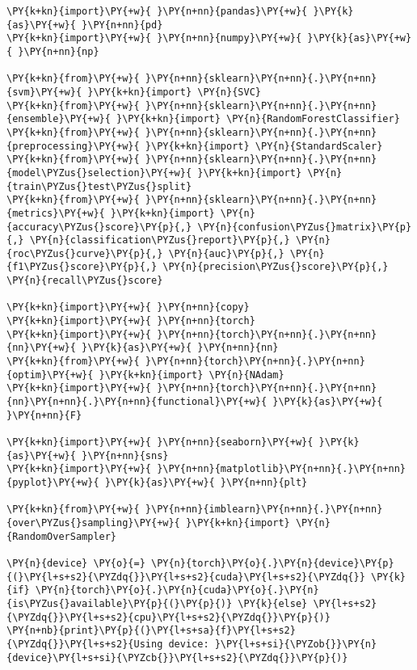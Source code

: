 
    \setcounter{page}{1}
    \begin{tcolorbox}[breakable, size=fbox, boxrule=1pt, pad at break*=1mm,colback=cellbackground, colframe=cellborder]
\begin{Verbatim}[commandchars=\\\{\}]
\PY{k+kn}{import}\PY{+w}{ }\PY{n+nn}{pandas}\PY{+w}{ }\PY{k}{as}\PY{+w}{ }\PY{n+nn}{pd}
\PY{k+kn}{import}\PY{+w}{ }\PY{n+nn}{numpy}\PY{+w}{ }\PY{k}{as}\PY{+w}{ }\PY{n+nn}{np}

\PY{k+kn}{from}\PY{+w}{ }\PY{n+nn}{sklearn}\PY{n+nn}{.}\PY{n+nn}{svm}\PY{+w}{ }\PY{k+kn}{import} \PY{n}{SVC}
\PY{k+kn}{from}\PY{+w}{ }\PY{n+nn}{sklearn}\PY{n+nn}{.}\PY{n+nn}{ensemble}\PY{+w}{ }\PY{k+kn}{import} \PY{n}{RandomForestClassifier}
\PY{k+kn}{from}\PY{+w}{ }\PY{n+nn}{sklearn}\PY{n+nn}{.}\PY{n+nn}{preprocessing}\PY{+w}{ }\PY{k+kn}{import} \PY{n}{StandardScaler}
\PY{k+kn}{from}\PY{+w}{ }\PY{n+nn}{sklearn}\PY{n+nn}{.}\PY{n+nn}{model\PYZus{}selection}\PY{+w}{ }\PY{k+kn}{import} \PY{n}{train\PYZus{}test\PYZus{}split}
\PY{k+kn}{from}\PY{+w}{ }\PY{n+nn}{sklearn}\PY{n+nn}{.}\PY{n+nn}{metrics}\PY{+w}{ }\PY{k+kn}{import} \PY{n}{accuracy\PYZus{}score}\PY{p}{,} \PY{n}{confusion\PYZus{}matrix}\PY{p}{,} \PY{n}{classification\PYZus{}report}\PY{p}{,} \PY{n}{roc\PYZus{}curve}\PY{p}{,} \PY{n}{auc}\PY{p}{,} \PY{n}{f1\PYZus{}score}\PY{p}{,} \PY{n}{precision\PYZus{}score}\PY{p}{,} \PY{n}{recall\PYZus{}score}

\PY{k+kn}{import}\PY{+w}{ }\PY{n+nn}{copy}
\PY{k+kn}{import}\PY{+w}{ }\PY{n+nn}{torch}
\PY{k+kn}{import}\PY{+w}{ }\PY{n+nn}{torch}\PY{n+nn}{.}\PY{n+nn}{nn}\PY{+w}{ }\PY{k}{as}\PY{+w}{ }\PY{n+nn}{nn}
\PY{k+kn}{from}\PY{+w}{ }\PY{n+nn}{torch}\PY{n+nn}{.}\PY{n+nn}{optim}\PY{+w}{ }\PY{k+kn}{import} \PY{n}{NAdam}
\PY{k+kn}{import}\PY{+w}{ }\PY{n+nn}{torch}\PY{n+nn}{.}\PY{n+nn}{nn}\PY{n+nn}{.}\PY{n+nn}{functional}\PY{+w}{ }\PY{k}{as}\PY{+w}{ }\PY{n+nn}{F}

\PY{k+kn}{import}\PY{+w}{ }\PY{n+nn}{seaborn}\PY{+w}{ }\PY{k}{as}\PY{+w}{ }\PY{n+nn}{sns}
\PY{k+kn}{import}\PY{+w}{ }\PY{n+nn}{matplotlib}\PY{n+nn}{.}\PY{n+nn}{pyplot}\PY{+w}{ }\PY{k}{as}\PY{+w}{ }\PY{n+nn}{plt}

\PY{k+kn}{from}\PY{+w}{ }\PY{n+nn}{imblearn}\PY{n+nn}{.}\PY{n+nn}{over\PYZus{}sampling}\PY{+w}{ }\PY{k+kn}{import} \PY{n}{RandomOverSampler}

\PY{n}{device} \PY{o}{=} \PY{n}{torch}\PY{o}{.}\PY{n}{device}\PY{p}{(}\PY{l+s+s2}{\PYZdq{}}\PY{l+s+s2}{cuda}\PY{l+s+s2}{\PYZdq{}} \PY{k}{if} \PY{n}{torch}\PY{o}{.}\PY{n}{cuda}\PY{o}{.}\PY{n}{is\PYZus{}available}\PY{p}{(}\PY{p}{)} \PY{k}{else} \PY{l+s+s2}{\PYZdq{}}\PY{l+s+s2}{cpu}\PY{l+s+s2}{\PYZdq{}}\PY{p}{)}
\PY{n+nb}{print}\PY{p}{(}\PY{l+s+sa}{f}\PY{l+s+s2}{\PYZdq{}}\PY{l+s+s2}{Using device: }\PY{l+s+si}{\PYZob{}}\PY{n}{device}\PY{l+s+si}{\PYZcb{}}\PY{l+s+s2}{\PYZdq{}}\PY{p}{)}
\end{Verbatim}
\end{tcolorbox}

